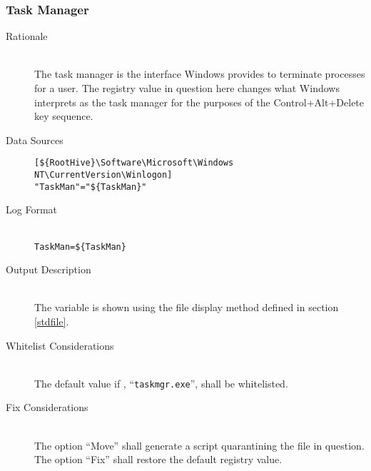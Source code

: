 \subsubsection{Task Manager}
\begin{description}
\item[Rationale] \hfill \\
The task manager is the interface Windows provides to terminate processes for a
user. The registry value in question here changes what Windows interprets as the
task manager for the purposes of the Control+Alt+Delete key sequence.
\item[Data Sources] \hfill
\vspace{-\baselineskip}
\begin{verbatim}
[${RootHive}\Software\Microsoft\Windows NT\CurrentVersion\Winlogon]
"TaskMan"="${TaskMan}"
\end{verbatim}
\item[Log Format] \hfill \\
\verb|TaskMan=${TaskMan}|
\item[Output Description] \hfill \\
The variable  is shown using the file display method defined in
section \ref{stdfile}.
\item[Whitelist Considerations] \hfill \\
The default value if , ``\verb|taskmgr.exe|'', shall be whitelisted.
\item[Fix Considerations] \hfill \\
The option ``Move'' shall generate a script quarantining the file in question.
The option ``Fix'' shall restore the default registry value.
\end{description}

